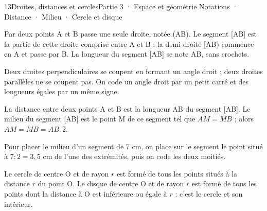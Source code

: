 \begin{ouverture}[geometrie]{13}{Droites, distances et cercles}{Partie 3 · Espace et géométrie}
{Notations · Distance · Milieu · Cercle et disque}
\end{ouverture}
\pagestyle{otMain}\essentiel\fontsize{11}{15}\selectfont
{}\label{cours-13-1}
\begin{definition}Par deux points A et B passe une seule droite, notée (AB). Le segment [AB] est la partie de cette droite comprise entre A et B ; la demi-droite [AB) commence en A et passe par B. La longueur du segment [AB] se note AB, sans crochets.\end{definition}
\label{fig-cours-13-1-cours-objets}

\begin{propriete}Deux droites perpendiculaires se coupent en formant un angle droit ; deux droites parallèles ne se coupent pas. On code un angle droit par un petit carré et des longueurs égales par un même signe.\end{propriete}
\begin{definition}La distance entre deux points A et B est la longueur AB du segment [AB]. Le milieu du segment [AB] est le point M de ce segment tel que $AM=MB$ ; alors $AM=MB=AB:2$.\end{definition}
\begin{savoirfaire}Pour placer le milieu d’un segment de 7 cm, on place sur le segment le point situé à $7:2=3{,}5$ cm de l’une des extrémités, puis on code les deux moitiés.\end{savoirfaire}
\clearpage
{}\label{cours-13-2}
\begin{definition}Le cercle de centre O et de rayon $r$ est formé de tous les points situés à la distance $r$ du point O. Le disque de centre O et de rayon $r$ est formé de tous les points dont la distance à O est inférieure ou égale à $r$ : c’est le cercle et son intérieur.\end{definition}
\label{fig-cours-13-2-cours-cercle}

